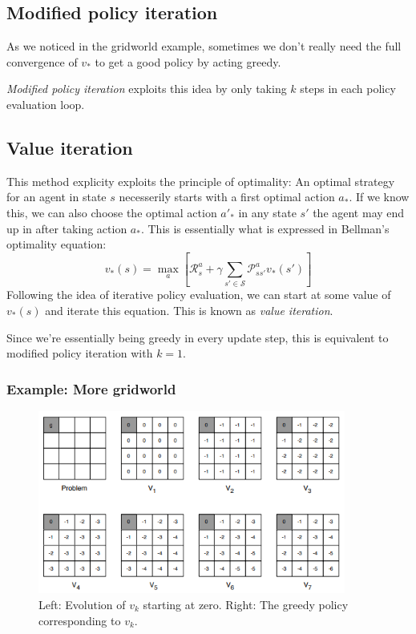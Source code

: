 \documentclass[12pt, a4paper]{article}
\numberwithin{equation}{section}
\begin{document}
\subsection{Modified policy iteration}
As we noticed in the gridworld example, sometimes we don't really need the full convergence of $v_*$ to get a good policy by acting greedy.

\textit{Modified policy iteration} exploits this idea by only taking $k$ steps in each policy evaluation loop.

\subsection{Value iteration}
This method explicity exploits the principle of optimality: An optimal strategy for an agent in state $s$ necesserily starts with a first optimal action $a_*$. If we know this, we can also choose the optimal action $a'_*$ in any state $s'$ the agent may end up in after taking action $a_*$. This is essentially what is expressed in Bellman's optimality equation:
\begin{equation}
v_*(s)=\underset{a}{\max}\left[\mathcal{R}^a_s+\gamma\sum_{s'\in\mathcal{S}}\mathcal{P}^a_{ss'}v_*(s')\right]
\end{equation}
Following the idea of iterative policy evaluation, we can start at some value of $v_*(s)$ and iterate this equation. This is known as \textit{value iteration}.

Since we're essentially being greedy in every update step, this is equivalent to modified policy iteration with $k=1$.

\subsubsection{Example: More gridworld}

\begin{figure}
\centering
\includegraphics[width=0.9\textwidth]{value_iteration}
\caption{Left: Evolution of $v_k$ starting at zero. Right: The greedy policy corresponding to $v_k$.}
\label{fig:value_iteration}
\end{figure}
\end{document}
